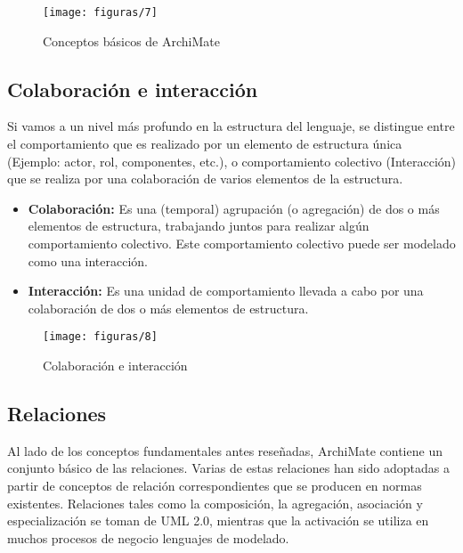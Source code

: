      \begin{figure}[H]
     	\centering
     	\texttt{[image: figuras/7]}
     	\captionsetup{width=.95\textwidth}
     	\caption{Conceptos básicos de ArchiMate}
     	\label{figura7}
     \end{figure}
  
  \subsection{Colaboración e interacción}
  Si vamos a un nivel más profundo en la estructura del lenguaje, se distingue entre el comportamiento que es realizado por un elemento de estructura única (Ejemplo: actor, rol, componentes, etc.), o comportamiento colectivo (Interacción) que se realiza por una colaboración de varios elementos de la estructura.
  
  \begin{itemize}
  	\item \textbf{Colaboración:} Es una (temporal) agrupación (o agregación) de dos o más elementos de estructura, trabajando juntos para realizar algún comportamiento colectivo. Este comportamiento colectivo puede ser modelado como una interacción.
  	\item \textbf{Interacción:} Es una unidad de comportamiento llevada a cabo por una colaboración de dos o más elementos de estructura.
  \end{itemize}
 
  \begin{figure}[H]
   	\centering
   	\texttt{[image: figuras/8]}
   	\captionsetup{width=.95\textwidth}
   	\caption{Colaboración e interacción}
   	\label{figura8}
  \end{figure}
  
  \subsection{Relaciones}
  Al lado de los conceptos fundamentales antes reseñadas, ArchiMate contiene un conjunto básico de las relaciones. Varias de estas relaciones han sido adoptadas a partir de conceptos de relación correspondientes que se producen en normas existentes. Relaciones tales como la composición, la agregación, asociación y especialización se toman de UML 2.0, mientras que la activación se utiliza en muchos procesos de negocio lenguajes de modelado.
  
